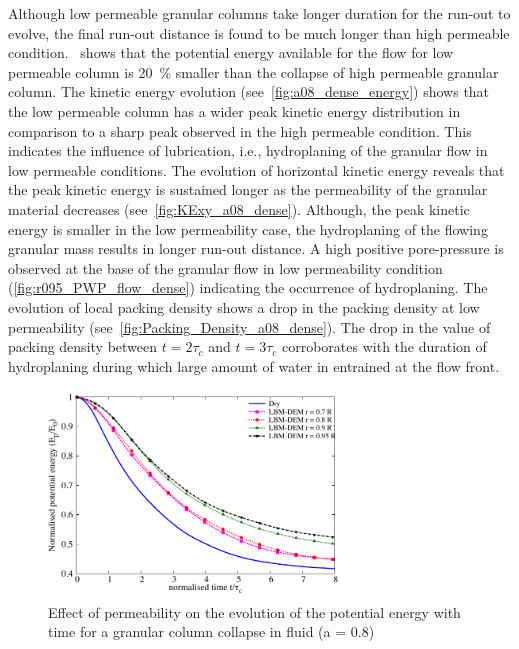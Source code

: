 Although low permeable granular columns take longer duration for the run-out to 
evolve, the final run-out distance is found to be much longer than high 
permeable condition.~ shows that the potential energy 
available for the flow for low permeable column is 20~\% smaller than the 
collapse of high permeable granular column. The kinetic energy evolution 
(see~\cref{fig:a08_dense_energy}) shows that the low permeable column has a 
wider peak kinetic energy distribution in comparison to a sharp peak observed 
in the high permeable condition. This indicates the influence of lubrication, 
i.e., 
hydroplaning of the granular flow in low permeable conditions. The evolution of 
horizontal kinetic energy reveals that the peak kinetic energy is sustained 
longer as the permeability of the granular material decreases 
(see~\cref{fig:KExy_a08_dense}). Although, the peak kinetic energy is smaller 
in the low permeability case, the hydroplaning of the flowing granular mass 
results in longer run-out distance. A high positive pore-pressure is observed 
at the base of the granular flow in low permeability condition 
(\cref{fig:r095_PWP_flow_dense}) indicating the occurrence of hydroplaning. The 
evolution of local packing density shows a drop in the packing density at low 
permeability (see~\cref{fig:Packing_Density_a08_dense}). The drop in the value 
of packing density between $t = 2\tau_c$ and $t=3\tau_c$ corroborates with the 
duration of hydroplaning during which large amount of water in entrained at the 
flow front.  

\begin{figure}
	\centering
    \includegraphics[width=0.7\textwidth]{PE_a08_dense}
    \caption{Effect of permeability on the evolution of the potential energy 
    with time for a granular column collapse in fluid (a = 0.8)}
    \label{fig:PE_a08_dense}
\end{figure}


